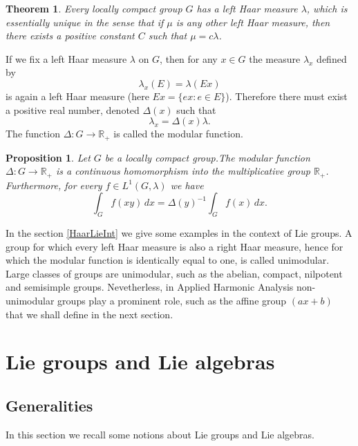 \documentclass[a4paper,11pt]{article} %
\numberwithin{equation}{section} %
\numberwithin{figure}{section} %
\newtheorem{thm}{Theorem}
\newtheorem{prop}{Proposition}
\begin{document}
\begin{thm} 
Every locally compact  group  $G$ has a left Haar measure $\lambda$, which is essentially unique in the sense that if $\mu$ is any other left Haar measure, then there exists a positive constant $C$ such that $\mu=c\lambda$.
\end{thm}

If we fix a left Haar measure $\lambda$ on $G$, then for any $x\in G$ the measure $\lambda_x$ defined by 
\begin{equation}
\lambda_x(E)=\lambda(Ex) 
\end{equation}
is again a left Haar measure (here $Ex=\{ex:e\in E\}$). Therefore there must exist a positive real number, denoted $\Delta(x)$ such that
\begin{equation}
\lambda_x=\Delta(x)\lambda.
\end{equation}
The function $\Delta:G\to\mathbb{R}_+$ is called the modular function.

\begin{prop} 
Let $G$ be a locally compact  group.The modular function $\Delta:G\to\mathbb{R}_+$ is a continuous homomorphism into the multiplicative group $\mathbb{R}_+$. Furthermore, for every $f\in L^1(G,\lambda)$ we have
\begin{equation}
\int_Gf(xy)\,dx=\Delta(y)^{-1} \int_Gf(x)\,dx. 
\end{equation}
\end{prop}

In the section \ref{HaarLieInt} we give some examples in the context of Lie groups. A group for which every left Haar measure is also a right Haar measure, hence for which the modular function is identically equal to one, is called unimodular. Large classes of groups are unimodular, such as the abelian, compact, nilpotent and semisimple groups. Nevetherless, in Applied Harmonic Analysis non-unimodular groups play a prominent role, such as the affine group $(ax+b)$ that we shall define in the next section.

\section{Lie groups and Lie algebras}

\subsection{Generalities}
 
In this section we recall some notions about Lie groups and Lie algebras. 
\end{document}
